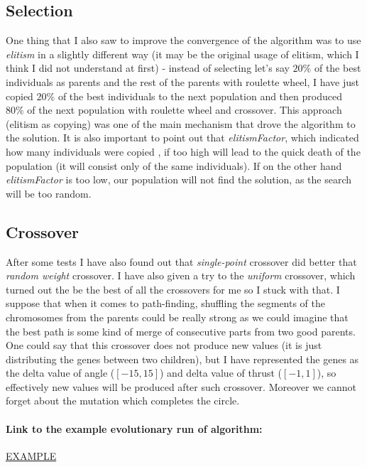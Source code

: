 \documentclass[11pt]{article}
\begin{document}
	\subsection{Selection}
	One thing that I also saw to improve the convergence of the algorithm was to use \textit{elitism} in a slightly different way (it may be the original usage of elitism, which I think I did not understand at first) - instead of selecting let's say $20\%$ of the best individuals as parents and the rest of the parents with roulette wheel, I have just copied $20\%$ of the best individuals to the next population and then produced $80\%$ of the next population with roulette wheel and crossover. This approach (elitism as copying) was one of the main mechanism that drove the algorithm to the solution. It is also important to point out that \textit{elitismFactor}, which indicated how many individuals were copied , if too high will lead to the quick death of the population (it will consist only of the same individuals). If on the other hand \textit{elitismFactor} is too low, our population will not find the solution, as the search will be too random.
	
	\subsection{Crossover}
	After some tests I have also found out that \textit{single-point} crossover did better that \textit{random weight} crossover. I have also given a try to the \textit{uniform} crossover, which turned out the be the best of all the crossovers for me so I stuck with that. I suppose that when it comes to path-finding, shuffling the segments of the chromosomes from the parents could be really strong as we could imagine that the best path is some kind of merge of consecutive parts from two good parents. One could say that this crossover does not produce new values (it is just distributing the genes between two children), but I have represented the genes as the delta value of angle ($[-15,15]$) and delta value of thrust ($[-1,1]$), so effectively new values will be produced after such crossover. Moreover we cannot forget about the mutation which completes the circle.
	
	\paragraph{Link to the example evolutionary run of algorithm: }
	\href{https://gph.is/g/Z86B130}{EXAMPLE}
	
\end{document}
